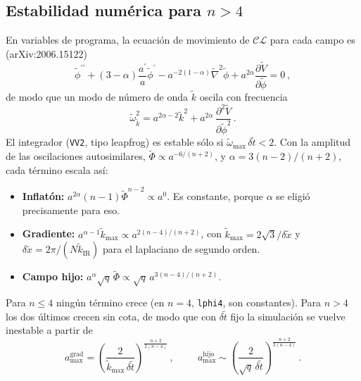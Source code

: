 \documentclass[11pt]{article}
\newcommand{\CosmoLattice}{\ensuremath{\mathcal{C}}\text{osmo}\ensuremath{\mathcal{L}}\text{attice}\xspace}
\begin{document}
        \subsection{Estabilidad numérica para $n > 4$}
            \label{sec:estabilidad}

            En variables de programa, la ecuación de movimiento de \CosmoLattice para cada campo es (arXiv:2006.15122)
            \begin{equation}
                \tilde{\phi}^{\prime\prime} + (3 - \alpha) \frac{a^\prime}{a} \tilde{\phi}^\prime - a^{-2(1-\alpha)} \tilde{\nabla}^2 \tilde{\phi} + a^{2\alpha} \frac{\partial \tilde{V}}{\partial \tilde{\phi}} = 0 \, ,
            \end{equation}
            de modo que un modo de número de onda $\tilde k$ oscila con frecuencia
            \begin{equation}
                \tilde{\omega}_{\tilde k}^2 = a^{2\alpha - 2} \tilde{k}^2 + a^{2\alpha} \, \frac{\partial^2 \tilde{V}}{\partial \tilde{\phi}^2} \, .
            \end{equation}
            El integrador (\texttt{VV2}, tipo leapfrog) es estable sólo si $\tilde{\omega}_{\max} \, \delta\tilde{t} < 2$. Con la amplitud de las oscilaciones autosimilares, $\tilde{\Phi} \propto a^{-6/(n+2)}$, y $\alpha = 3(n-2)/(n+2)$, cada término escala así:
            \begin{itemize}
                \item \textbf{Inflatón:} $a^{2\alpha} (n-1) \tilde\Phi^{n-2} \propto a^{0}$. Es constante, porque $\alpha$ se eligió precisamente para eso.
                \item \textbf{Gradiente:} $a^{\alpha-1} \tilde{k}_{\max} \propto a^{2(n-4)/(n+2)}$, con $\tilde{k}_{\max} = 2\sqrt{3}/\delta\tilde{x}$ y $\delta\tilde x = 2\pi / (N \tilde{k}_{\text{IR}})$ para el laplaciano de segundo orden.
                \item \textbf{Campo hijo:} $a^{\alpha} \sqrt{q} \, \tilde\Phi \propto \sqrt{q} \, a^{3(n-4)/(n+2)}$.
            \end{itemize}
            Para $n \le 4$ ningún término crece (en $n = 4$, \texttt{lphi4}, son constantes). Para $n > 4$ los dos últimos crecen sin cota, de modo que con $\delta\tilde t$ fijo la simulación se vuelve inestable a partir de
            \begin{equation}
                a_{\max}^{\text{grad}} = \left( \frac{2}{\tilde{k}_{\max} \, \delta\tilde{t}} \right)^{\frac{n+2}{2(n-4)}} \, ,
                \hspace{1cm}
                a_{\max}^{\text{hijo}} \sim \left( \frac{2}{\sqrt{q} \, \delta\tilde{t}} \right)^{\frac{n+2}{3(n-4)}} \, .
            \end{equation}
\end{document}
